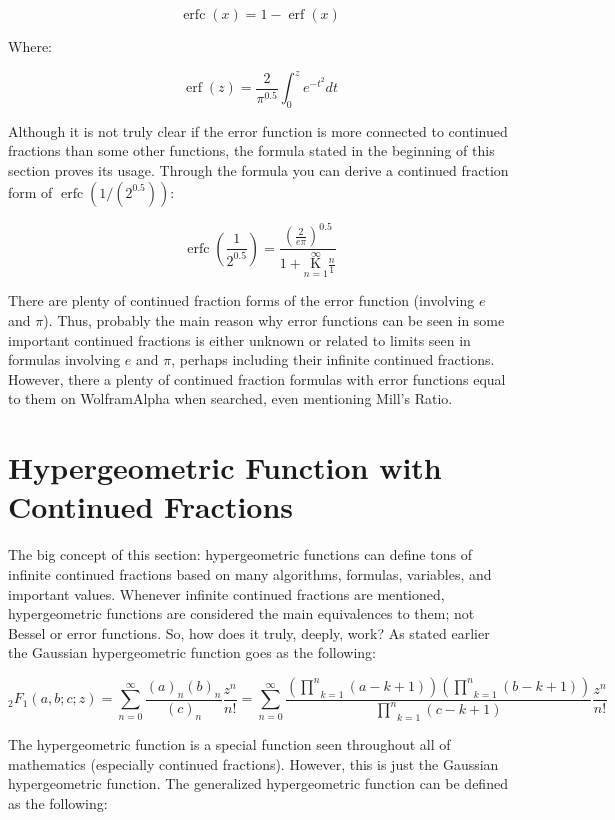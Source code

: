 \documentclass{article}
\DeclareMathOperator\comperrorfunc{erfc}
\DeclareMathOperator\errorfunc{erf}
\begin{document}
$$\comperrorfunc(x) =1- \errorfunc(x)$$

Where:

$$\errorfunc(z)=\frac{2}{\pi^{0.5}}\int_{0}^z e^{-t^2} dt$$

Although it is not truly clear if the error function is more connected to continued fractions than some other functions, the formula stated in the beginning of this section proves its usage. Through the formula you can derive a continued fraction form of $\comperrorfunc(1/(2^{0.5}))$:

$$\comperrorfunc(\frac{1}{2^{0.5}}) = \frac{(\frac{2}{e\pi})^{0.5}}{1+\underset{n=1}{\overset{\infty}{ \mathrm K}} \frac{n}{1}}$$

There are plenty of continued fraction forms of the error function (involving $e$ and $\pi$). Thus, probably the main reason why error functions can be seen in some important continued fractions is either unknown or related to limits seen in formulas involving $e$ and $\pi$, perhaps including their infinite continued fractions. However, there a plenty of continued fraction formulas with error functions equal to them on WolframAlpha when searched, even mentioning Mill’s Ratio.

\section {Hypergeometric Function with Continued Fractions}

The big concept of this section: hypergeometric functions can define tons of infinite continued fractions based on many algorithms, formulas, variables, and important values. Whenever infinite continued fractions are mentioned, hypergeometric functions are considered the main equivalences to them; not Bessel or error functions. So, how does it truly, deeply, work? As stated earlier the Gaussian hypergeometric function goes as the following:

$$ {}_2 F_1 (a,b;c;z) = \underset{n=0}{\overset{\infty}{\sum}} \frac{(a)_n (b)_n}{(c)_n}\frac{z^n}{n!} = \underset{n=0}{\overset{\infty}{\sum}} \frac{(\underset{k=1}{\overset{n}{\prod}} (a-k+1)) (\underset{k=1}{\overset{n}{\prod}} (b-k+1))}{\underset{k=1}{\overset{n}{\prod}} (c-k+1)}\frac{z^n}{n!} $$

The hypergeometric function is a special function seen throughout all of mathematics (especially continued fractions). However, this is just the Gaussian hypergeometric function. The generalized hypergeometric function can be defined as the following:
\end{document}
